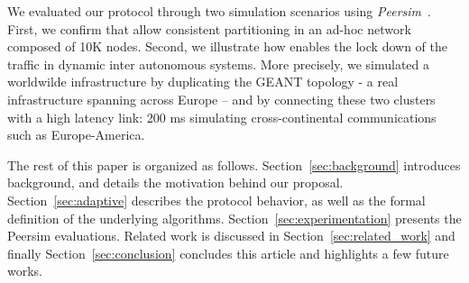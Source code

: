 
We evaluated our protocol through two simulation scenarios using
\textit{Peersim}~\cite{montresor2009peersim}. First, we confirm that
\NAME allow consistent partitioning in an ad-hoc network composed of
10K nodes.  Second, we illustrate how \NAME enables the lock down of
the traffic in dynamic inter autonomous systems.  More precisely, we
simulated a worldwilde infrastructure by duplicating the GEANT
topology - a real infrastructure spanning across Europe – and by
connecting these two clusters with a high latency link: 200 ms
simulating cross-continental communications such as Europe-America.


The rest of this paper is organized as
follows. Section~\ref{sec:background} introduces background, and
details the motivation behind our proposal.
Section~\ref{sec:adaptive} describes the protocol behavior, as well
as the formal definition of the underlying
algorithms. Section~\ref{sec:experimentation} presents the Peersim
evaluations.  Related work is discussed in
Section~\ref{sec:related_work} and finally
Section~\ref{sec:conclusion} concludes this article and highlights a
few future works.
  

